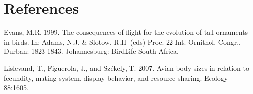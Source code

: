 \documentclass[
  12pt,
]{article}
\begin{document}
\newpage

\hypertarget{references}{%
\section{References}\label{references}}

Evans, M.R. 1999. The consequences of flight for the evolution of tail
ornaments in birds. In: Adams, N.J. \& Slotow, R.H. (eds) Proc. 22 Int.
Ornithol. Congr., Durban: 1823-1843. Johannesburg: BirdLife South
Africa.

Lislevand, T., Figuerola, J., and Székely, T. 2007. Avian body sizes in
relation to fecundity, mating system, display behavior, and resource
sharing. Ecology 88:1605.
\end{document}
